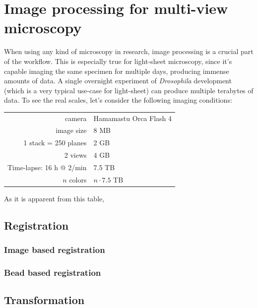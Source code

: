 

\section{Image processing for multi-view microscopy}
  \graphicspath{{./figures/3_processing/}}

  When using any kind of microscopy in research, image processing is a crucial part of the workflow. This is especially true for light-sheet microscopy, since it's capable imaging the same specimen for multiple days, producing immense amounts of data. A single overnight experiment of \textit{Drosophila} development (which is a very typical use-case for light-sheet) can produce multiple terabytes of data. To see the real scales, let's consider the following imaging conditions:
  \begin{center}
  \begin{tabular}{rl}
      camera & Hamamastu Orca Flash 4 \\
      image size & 8 MB \\
      1 stack = 250 planes & 2 GB \\
      2 views & 4 GB \\
      Time-lapse: 16 h @ 2/min & 7.5 TB \\
      $n$ colors & $n\cdot 7.5$ TB
  \end{tabular}
  \end{center}

  As it is apparent from this table, 

      
  \subsection{Registration}
    \subsubsection{Image based registration}
    \subsubsection{Bead based registration}
  \subsection{Transformation}
